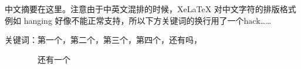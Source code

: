 中文摘要在这里。注意由于中英文混排的时候，XeLaTeX 对中文字符的排版格式例如 hanging 好像不能正常支持，所以下方关键词的换行用了一个hack……


{\fsb 关键词：}第一个，第二个，第三个，第四个，还有吗，

~~~~~~~~还有一个 %